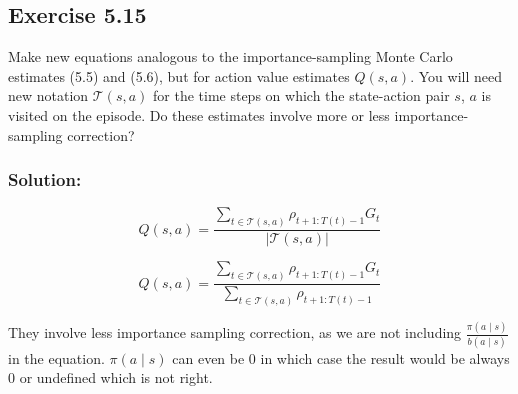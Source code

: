 \subsection*{Exercise 5.15}
Make new equations analogous to the importance-sampling Monte Carlo
estimates (5.5) and (5.6), but for action value estimates $Q(s, a)$. You will need new
notation $\mathcal{T}(s,a)$ for the time steps on which the state-action pair $s$, $a$ is visited on the
episode. Do these estimates involve more or less importance-sampling correction?

\subsubsection*{Solution:}

\[
Q(s,a) = \frac{\sum_{t \in \mathcal{T}(s,a)} \rho_{t+1:T(t) - 1} G_t}
{|\mathcal{T}(s,a)|}
\]

\[
Q(s,a) = \frac{\sum_{t \in \mathcal{T}(s,a)} \rho_{t+1:T(t) - 1} G_t}
{\sum_{t \in \mathcal{T}(s,a)} \rho_{t+1:T(t) - 1}}
\]

They involve less importance sampling correction, as we are not including $\frac{\pi(a \mid s)}{b(a \mid s)}$ in the equation. $\pi(a \mid s)$ can even be 0 in which case the result would be always 0 or undefined which is not right.